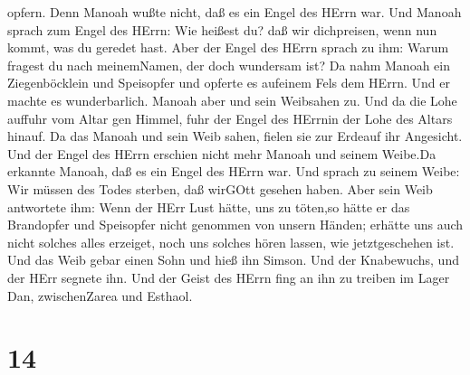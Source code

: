 opfern. Denn Manoah wußte nicht, daß es ein Engel des HErrn war.
 Und Manoah sprach zum Engel des HErrn: Wie heißest du? daß
wir dichpreisen, wenn nun kommt, was du geredet hast.  Aber
der Engel des HErrn sprach zu ihm: Warum fragest du nach meinemNamen,
der doch wundersam ist?  Da nahm Manoah ein Ziegenböcklein
und Speisopfer und opferte es aufeinem Fels dem HErrn. Und er machte es
wunderbarlich. Manoah aber und sein Weibsahen zu.  Und da
die Lohe auffuhr vom Altar gen Himmel, fuhr der Engel des HErrnin der
Lohe des Altars hinauf. Da das Manoah und sein Weib sahen, fielen sie
zur Erdeauf ihr Angesicht.  Und der Engel des HErrn
erschien nicht mehr Manoah und seinem Weibe.Da erkannte Manoah, daß es
ein Engel des HErrn war.  Und sprach zu seinem Weibe: Wir
müssen des Todes sterben, daß wirGOtt gesehen haben.  Aber
sein Weib antwortete ihm: Wenn der HErr Lust hätte, uns zu töten,so
hätte er das Brandopfer und Speisopfer nicht genommen von unsern Händen;
erhätte uns auch nicht solches alles erzeiget, noch uns solches hören
lassen, wie jetztgeschehen ist.  Und das Weib gebar einen
Sohn und hieß ihn Simson. Und der Knabewuchs, und der HErr segnete ihn.
 Und der Geist des HErrn fing an ihn zu treiben im Lager
Dan, zwischenZarea und Esthaol.

\hypertarget{section-13}{%
\section{14}\label{section-13}}

